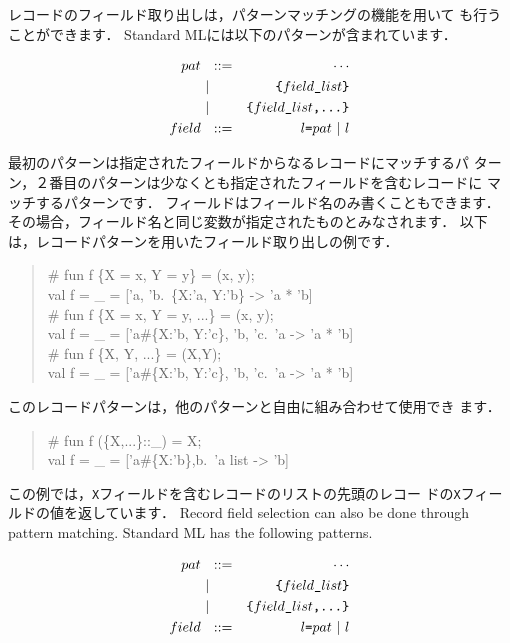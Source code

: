 \documentclass{jbook}
\newcommand{\vbar}{\mbox{\ $|$\ }}
\begin{document}
\ifjp%
	レコードのフィールド取り出しは，パターンマッチングの機能を用いて
も行うことができます．
	Standard MLには以下のパターンが含まれています．
\begin{tt}
\begin{eqnarray*}
pat &\mbox{\ \ }::=& \cdots \\
     &\vbar& \mbox{\tt \{$field\_list$\}}
\\
     &\vbar& \mbox{\tt \{$field\_list$,...\}}
\\
field &\mbox{\ \ }::=& \mbox{\tt $l$=$pat$} \ | \ l
\end{eqnarray*}
\end{tt}
	最初のパターンは指定されたフィールドからなるレコードにマッチするパ
ターン，２番目のパターンは少なくとも指定されたフィールドを含むレコードに
マッチするパターンです．
	フィールドはフィールド名のみ書くこともできます．
	その場合，フィールド名と同じ変数が指定されたものとみなされます．
	以下は，レコードパターンを用いたフィールド取り出しの例です．
\begin{tt}\begin{quote}
\# fun f \{X = x, Y = y\} = (x, y);\\
val f = \_ = ['a, 'b.~\{X:'a, Y:'b\} -> 'a * 'b]\\
\# fun f \{X = x, Y = y, ...\} = (x, y);\\
val f = \_ = ['a\#\{X:'b, Y:'c\}, 'b, 'c.~'a -> 'a * 'b]\\
\# fun f \{X, Y, ...\} = (X,Y);\\
val f = \_ = ['a\#\{X:'b, Y:'c\}, 'b, 'c.~'a -> 'a * 'b]
\end{quote}\end{tt}
	このレコードパターンは，他のパターンと自由に組み合わせて使用でき
ます．
\begin{tt}\begin{quote}
\# fun f (\{X,...\}::\_) = X;\\
val f = \_ = ['a\#\{X:'b\},b.~'a list -> 'b]\\
\end{quote}\end{tt}
	この例では，{\tt X}フィールドを含むレコードのリストの先頭のレコー
ドの{\tt X}フィールドの値を返しています．
\else%
	Record field selection can also be done through pattern
matching.
	Standard ML has the following patterns.
\begin{tt}
\begin{eqnarray*}
pat &\mbox{\ \ }::=& \cdots \\
     &\vbar& \mbox{\tt \{$field\_list$\}}
\\
     &\vbar& \mbox{\tt \{$field\_list$,...\}}
\\
field &\mbox{\ \ }::=& \mbox{\tt $l$=$pat$} \ | \ l
\end{eqnarray*}
\end{tt}
\end{document}
